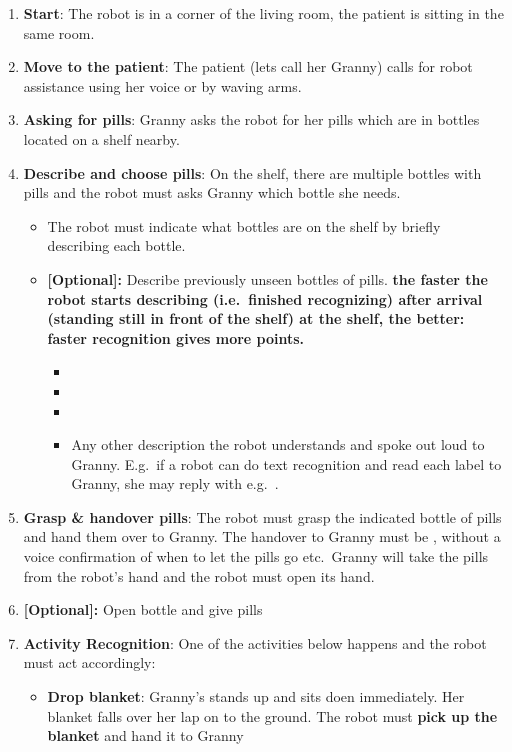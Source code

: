 \begin{enumerate}
	\item \textbf{Start}: The robot is in a corner of the living room, the patient is sitting in the same room. 
	\item \textbf{Move to the patient}: The patient (lets call her Granny) calls for robot assistance using her voice or by waving arms.
	\item \textbf{Asking for pills}: Granny asks the robot for her pills which are in bottles located on a shelf nearby. 
	\item \textbf{Describe and choose pills}: On the shelf, there are multiple bottles with pills and the robot must asks Granny which bottle she needs.
	\begin{itemize}
		\item The robot must indicate what bottles are on the shelf by briefly describing each bottle.
		\item \textbf{[Optional]:} Describe previously unseen bottles of pills. 
		\textbf{the faster the robot starts describing (i.e.~finished recognizing) after arrival (standing still in front of the shelf) at the shelf, the better: faster recognition gives more points. }
		\begin{itemize}
 			\item {}
  			\item {}
  			\item {}
  			\item Any other description the robot understands and spoke out loud to Granny. E.g.~if a robot can do text recognition and read each label to Granny, she may reply with e.g.~.
 		\end{itemize}
 	\end{itemize}
 	\item \textbf{Grasp \& handover pills}: The robot must grasp the indicated bottle of pills and hand them over to Granny. The handover to Granny must be , without a voice confirmation of when to let the pills go etc.~Granny will take the pills from the robot's hand and the robot must open its hand.
 	\item \textbf{[Optional]:} Open bottle and give pills
 	\item \textbf{Activity Recognition}: One of the activities below happens and the robot must act accordingly:
 	\begin{itemize}
 		\item \textbf{Drop blanket}: Granny's stands up and sits doen immediately. Her blanket falls over her lap on to the ground. The robot must \textbf{pick up the blanket} and hand it to Granny

\end{itemize}
\end{enumerate}
